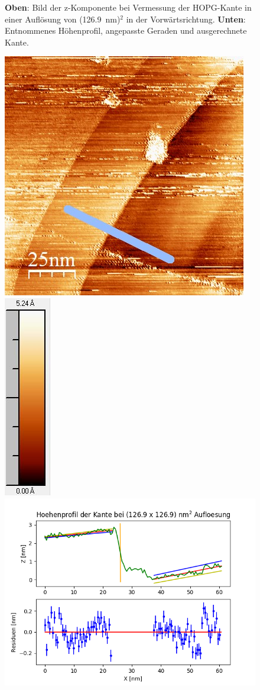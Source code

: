 \documentclass[12pt,a4paper]{article}
\begin{document}
\begin{figure}
\caption{\textbf{Oben}: Bild der z-Komponente bei Vermessung der HOPG-Kante in einer Auflösung von (\SI{126,9}{nm})$^2$ in der Vorwärtsrichtung. \textbf{Unten}: Entnommenes Höhenprofil, angepasste Geraden und ausgerechnete Kante.}
\end{figure}

\begin{figure}
\centering
\includegraphics[scale=0.6]{Bilder/Anhang/Kante/1269_Kante_nach.jpg}
\includegraphics[scale=0.6]{Bilder/Anhang/Kante/1269_Kante_nach_Skala.jpg}
\includegraphics[scale=0.6]{Bilder/Anhang/Kante/Profil_Kante_1269_rueck.png}

\end{figure}
\end{document}
